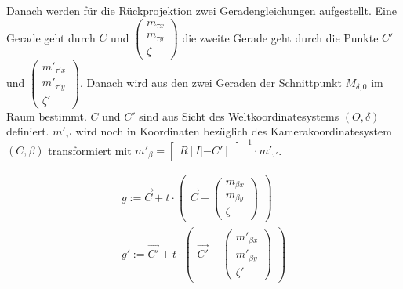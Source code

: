 Danach werden für die Rückprojektion zwei Geradengleichungen aufgestellt. Eine Gerade geht durch $C$ und $	\begin{pmatrix}
m_{\tau x} \\
m_{\tau y}\\
\zeta
\end{pmatrix} $ die zweite Gerade geht durch die Punkte $C'$ und $	\begin{pmatrix}
m'_{\tau' x} \\
m'_{\tau' y}\\
\zeta'
\end{pmatrix}$. Danach wird aus den zwei Geraden der Schnittpunkt $M_{\delta,0}$ im Raum bestimmt. $C$ und $C'$ sind aus Sicht des Weltkoordinatesystems $(O,\delta)$ definiert. $m'_{\tau'}$ wird noch in Koordinaten bezüglich des Kamerakoordinatesystem $(C,\beta)$ transformiert mit $m'_\beta = \begin{bmatrix}
R[I|-C']
\end{bmatrix}^{-1} \cdot m'_{\tau'}$.



\begin{gather}
	 g:= \vec{C} + t \cdot 
	\begin{pmatrix}
	 	\vec{C} -	
	\begin{pmatrix}	
	m_{\beta x} \\
	m_{\beta y}\\
	\zeta
	\end{pmatrix}
 \end{pmatrix} \\
g' := \vec{C'} + t \cdot 
\begin{pmatrix}
	\vec{C'} -
	\begin{pmatrix}
	m'_{\beta x} \\
	m'_{\beta y}\\
	\zeta'
	\end{pmatrix}
\end{pmatrix}
\end{gather}


 
%

